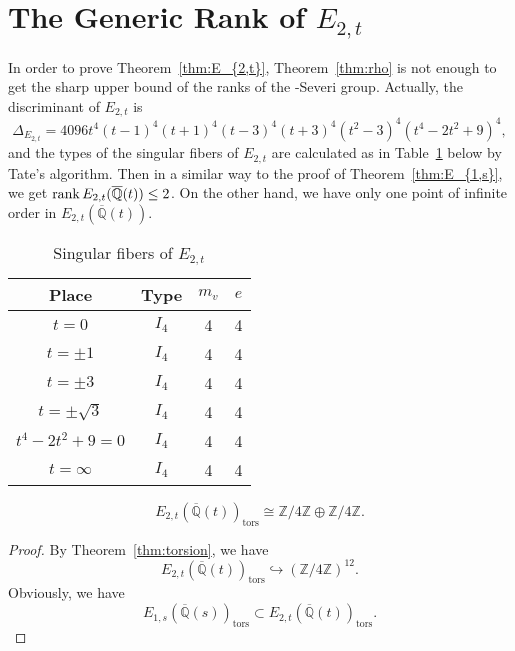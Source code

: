 \documentclass[main]{subfiles}
\begin{document}
\section{The Generic Rank of \texorpdfstring{$E_{2,t}$}{E2,t}}

In order to prove Theorem~\ref{thm:E_{2,t}}, Theorem~\ref{thm:rho} is not enough to get the sharp upper bound of the ranks of the \Neron-Severi group.
Actually, the discriminant of $E_{2,t}$ is
\begin{equation*}
    \Delta_{E_{2,t}} = 4096t^{4}(t - 1)^{4}(t + 1)^{4}(t - 3)^{4}(t + 3)^{4}(t^{2} - 3)^{4}(t^{4} - 2t^{2} + 9)^{4},
\end{equation*}
and the types of the singular fibers of $E_{2,t}$ are calculated as in Table~\ref{tab:E_{2,t}} below by Tate's algorithm.
Then in a similar way to the proof of Theorem~\ref{thm:E_{1,s}}, we get $\operatorname{rank} E_{2,t}(\overline{\mathbb{Q}}(t)) \leq 2$.
On the other hand, we have only one point of infinite order in $E_{2,t}(\overline{\mathbb{Q}}(t))$.
\begin{table}[ht]
    \centering
    \caption{Singular fibers of $E_{2,t}$}
    \begin{tabular}{|c|c|c|c|}
        \hline
        Place            & Type  & $m_v$ & $e$ \\
        \hline
        $t=0$            & $I_4$ & 4     & 4   \\
        $t=\pm 1$        & $I_4$ & 4     & 4   \\
        $t=\pm 3$        & $I_4$ & 4     & 4   \\
        $t=\pm \sqrt{3}$ & $I_4$ & 4     & 4   \\
        $t^4-2t^2+9=0$   & $I_4$ & 4     & 4   \\
        $t=\infty$       & $I_4$ & 4     & 4   \\
        \hline
    \end{tabular}
    \label{tab:E_{2,t}}
\end{table}

\begin{lem}
    \begin{equation*}
        E_{2,t}(\overline{\mathbb{Q}}(t))_{\text{tors}} \cong \mathbb{Z} / 4 \mathbb{Z} \oplus \mathbb{Z} / 4 \mathbb{Z}.
    \end{equation*}
\end{lem}
\begin{proof}
    By Theorem~\ref{thm:torsion}, we have
    \begin{equation*}
        E_{2,t}(\overline{\mathbb{Q}}(t))_{\text{tors}} \hookrightarrow (\mathbb{Z} / 4 \mathbb{Z})^{12}.
    \end{equation*}
    Obviously, we have
    \begin{equation*}
        E_{1,s}(\overline{\mathbb{Q}}(s))_{\text{tors}} \subset E_{2,t}(\overline{\mathbb{Q}}(t))_{\text{tors}}.
    \end{equation*}
\end{proof}
\end{document}

